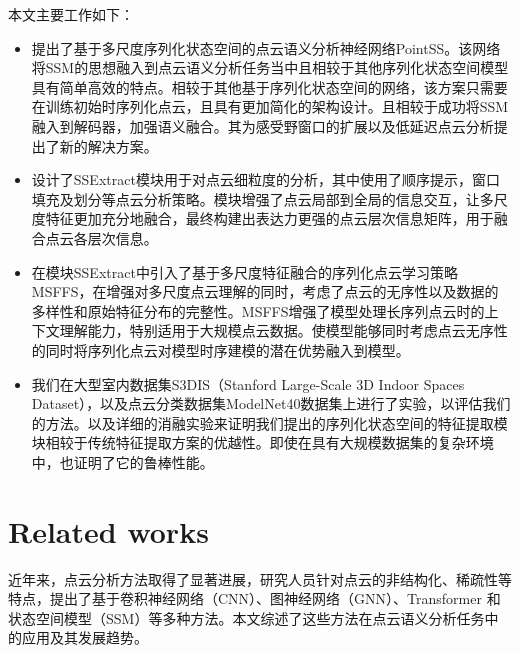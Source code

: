 \documentclass[preprint,12pt]{elsarticle}
\begin{document}
本文主要工作如下：
\begin{itemize}
	\item 提出了基于多尺度序列化状态空间的点云语义分析神经网络PointSS。该网络将SSM的思想融入到点云语义分析任务当中且相较于其他序列化状态空间模型具有简单高效的特点。相较于其他基于序列化状态空间的网络，该方案只需要在训练初始时序列化点云，且具有更加简化的架构设计。且相较于成功将SSM融入到解码器，加强语义融合。其为感受野窗口的扩展以及低延迟点云分析提出了新的解决方案。
	\item 设计了SSExtract模块用于对点云细粒度的分析，其中使用了顺序提示，窗口填充及划分等点云分析策略。模块增强了点云局部到全局的信息交互，让多尺度特征更加充分地融合，最终构建出表达力更强的点云层次信息矩阵，用于融合点云各层次信息。
	\item 在模块SSExtract中引入了基于多尺度特征融合的序列化点云学习策略MSFFS，在增强对多尺度点云理解的同时，考虑了点云的无序性以及数据的多样性和原始特征分布的完整性。MSFFS增强了模型处理长序列点云时的上下文理解能力，特别适用于大规模点云数据。使模型能够同时考虑点云无序性的同时将序列化点云对模型时序建模的潜在优势融入到模型。
	\item 我们在大型室内数据集S3DIS（Stanford Large-Scale 3D Indoor Spaces Dataset）\cite{s3dis}，以及点云分类数据集ModelNet40\cite{ModelNet40}数据集上进行了实验，以评估我们的方法。以及详细的消融实验来证明我们提出的序列化状态空间的特征提取模块相较于传统特征提取方案的优越性。即使在具有大规模数据集的复杂环境中，也证明了它的鲁棒性能。
\end{itemize}






\section{Related works}
近年来，点云分析方法取得了显著进展，研究人员针对点云的非结构化、稀疏性等特点，提出了基于卷积神经网络（CNN）、图神经网络（GNN）、Transformer 和状态空间模型（SSM）等多种方法。本文综述了这些方法在点云语义分析任务中的应用及其发展趋势。
\end{document}
